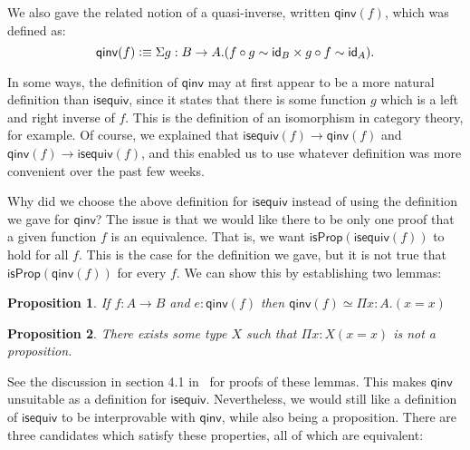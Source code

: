 \documentclass[11pt]{article}
\newcommand*{\isProp}{\mathsf{isProp}}
\newcommand{\iseq}{\mathsf{isequiv}}
\newcommand{\qinv}{\mathsf{qinv}}
\newcommand*{\comp}{\mathbin{\circ}}
\newtheorem{proposition}{Proposition}
\begin{document}
We also gave the related notion of a quasi-inverse, written $\qinv(f)$, which
was defined as: $$\qinv(f)\defeq \Sigma g:B\to A.(f\comp g\sim \id_B \times
g\comp f\sim \id_A).$$

In some ways, the definition of $\qinv$ may at first appear to be a more
natural definition than $\iseq$, since it states that there is some function
$g$ which is a left and right inverse of $f$. This is the definition of an
isomorphism in category theory, for example. Of course, we explained that
$\iseq(f) \to \qinv(f)$ and $\qinv(f) \to \iseq(f)$, and this enabled us to use
whatever definition was more convenient over the past few weeks.

Why did we choose the above definition for $\iseq$ instead of using the
definition we gave for $\qinv$? The issue is that we would like there to be
only one proof that a given function $f$ is an equivalence. That is, we want
$\isProp(\iseq(f))$ to hold for all $f$. This is the case for the definition we
gave, but it is not true that $\isProp(\qinv(f))$ for every $f$. We can show this 
by establishing two lemmas:

\begin{proposition}
If $f: A \to B$ and $e: \qinv(f)$ then $\qinv(f) \simeq \Pi x{:}A. (x = x)$
\end{proposition}

\begin{proposition}
There exists some type $X$ such that $\Pi x{:}X (x = x)$ is not a proposition.
\end{proposition}

See the discussion in section 4.1 in~\cite{HoTTBook2013} for proofs of these
lemmas. This makes $\qinv$ unsuitable as a definition for $\iseq$. 
Nevertheless, we would still like a definition of $\iseq$ to be interprovable with $\qinv$,
while also being a proposition. There are three candidates which satisfy these properties, all of which are equivalent:
\end{document}
